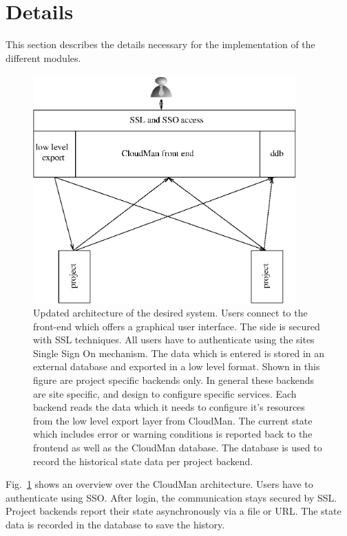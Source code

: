 \section{Details}
This section describes the details necessary for the implementation of the different modules.

\begin{figure}
\begin{center}
\includegraphics[width=0.9\textwidth]{cloudman_highlevel.eps}
\caption{\label{architecture} Updated architecture of the desired system. Users connect to the front-end which offers a graphical user interface. The side is secured with SSL techniques. All users have to authenticate using the sites Single Sign On mechanism. The data which is entered is stored in an external database and exported in a low level format. Shown in this figure are project specific backends only. In general these backends are site specific, and design to configure specific services. Each backend reads the data which it needs to configure it's resources from the low level export layer from CloudMan. The current state which includes error or warning conditions is reported back to the frontend as well as the CloudMan database. The database is used to record the historical state data per project backend.}
\end{center}
\end{figure}
Fig.~\ref{architecture} shows an overview over the CloudMan architecture. Users have to authenticate using SSO. After login, the communication stays secured by SSL. Project backends report their state asynchronously via a file or URL. The state data is recorded in the database to save the history. 
